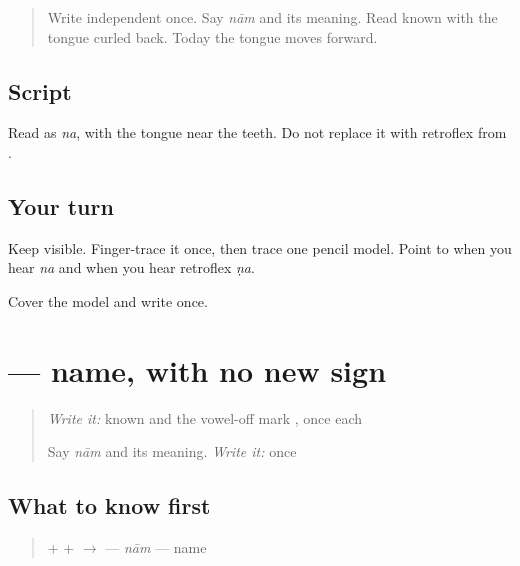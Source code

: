\label{lesson:MW-W05-na}



\begin{quote}
Write independent \textbf{} once. Say \emph{nām} and its meaning. Read known \textbf{} with the tongue curled back. Today the tongue moves forward.
\end{quote}

\subsection*{Script}

\begin{quote}
\end{quote}

Read \textbf{} as \emph{na}, with the tongue near the teeth. Do not replace it with retroflex \textbf{} from \textbf{}.

\subsection*{Your turn}
Keep \textbf{} visible. Finger-trace it once, then trace one pencil model. Point to \textbf{} when you hear \emph{na} and \textbf{} when you hear retroflex \emph{ṇa}.

\begin{tcolorbox}[breakable,colback=teal!4,colframe=teal!35!black,title={Before you move on}]
Cover the model and write \textbf{} once.
\end{tcolorbox}
\section[\texorpdfstring{\mw{नाम} (nām)}{नाम (nām)}]{ — name, with no new sign}

\label{lesson:MW-C05-naam}



\begin{quote}
\emph{Write it:} known \textbf{} and the vowel-off mark \textbf{}, once each

Say \emph{nām} and its meaning. \emph{Write it:} \textbf{} once
\end{quote}

\subsection*{What to know first}
\begin{quote}
\textbf{} + \textbf{} + \textbf{} $\to$ \textbf{} — \emph{nām} — name
\end{quote}

